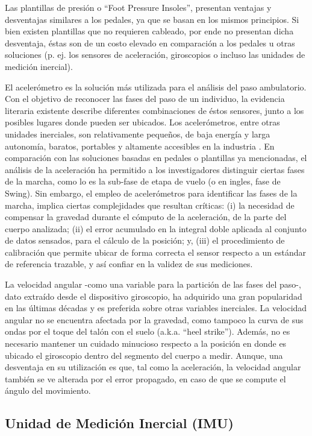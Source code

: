Las plantillas de presión o ``Foot Pressure Insoles'', presentan ventajas y desventajas similares a los pedales, ya que se basan en los mismos principios. Si bien existen plantillas que no requieren cableado, por ende no presentan dicha desventaja, éstas son de un costo elevado en comparación a los pedales u otras soluciones (p. ej. los sensores de aceleración, giroscopios o incluso las unidades de medición inercial). 

El acelerómetro es la solución más utilizada para el análisis del paso ambulatorio. Con el objetivo de reconocer las fases del paso de un individuo, la evidencia literaria existente describe diferentes combinaciones de éstos sensores, junto a los posibles lugares donde pueden ser ubicados. Los acelerómetros, entre otras unidades inerciales, son relativamente pequeños, de baja energía y larga autonomía, baratos, portables y altamente accesibles en la industria \cite{TongKaiyuGranat1999}. En comparación con las soluciones basadas en pedales o plantillas ya mencionadas, el análisis de la aceleración ha permitido a los investigadores distinguir ciertas fases de la marcha, como lo es la sub-fase de etapa de vuelo (o en ingles, fase de Swing). Sin embargo, el empleo de acelerómetros para identificar las fases de la marcha, implica ciertas complejidades que resultan críticas: (i) la necesidad de compensar la gravedad durante el cómputo de la aceleración, de la parte del cuerpo analizada; (ii) el error acumulado en la integral doble aplicada al conjunto de datos sensados, para el cálculo de la posición; y, (iii) el procedimiento de calibración que permite ubicar de forma correcta el sensor respecto a un estándar de referencia trazable, y así confiar en la validez de sus mediciones.

La velocidad angular -como una variable para la partición de las fases del paso-, dato extraído desde el dispositivo giroscopio, ha adquirido una gran popularidad en las últimas décadas y es preferida sobre otras variables inerciales. La velocidad angular no se encuentra afectada por la gravedad, como tampoco la curva de sus ondas por el toque del talón con el suelo (a.k.a. ``heel strike''). Además, no es necesario mantener un cuidado minucioso respecto a la posición en donde es ubicado el giroscopio dentro del segmento del cuerpo a medir. Aunque, una desventaja en su utilización es que, tal como la aceleración, la velocidad angular también se ve alterada por el error propagado, en caso de que se compute el ángulo del movimiento. 

\subsection{Unidad de Medición Inercial (IMU)}

